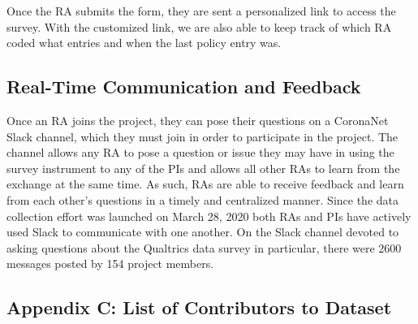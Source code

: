 \documentclass[]{article}
\begin{document}
Once the RA submits the form, they are sent a personalized link to access the survey. With the customized link, we are also able to keep track of which RA coded what entries and when the last policy entry was.

\hypertarget{real-time-communication-and-feedback}{%
\subsection{Real-Time Communication and Feedback}\label{real-time-communication-and-feedback}}

Once an RA joins the project, they can pose their questions on a CoronaNet Slack channel, which they must join in order to participate in the project. The channel allows any RA to pose a question or issue they may have in using the survey instrument to any of the PIs and allows all other RAs to learn from the exchange at the same time. As such, RAs are able to receive feedback and learn from each other's questions in a timely and centralized manner. Since the data collection effort was launched on March 28, 2020 both RAs and PIs have actively used Slack to communicate with one another. On the Slack channel devoted to asking questions about the Qualtrics data survey in particular, there were 2600 messages posted by 154 project members.

\hypertarget{appendix-c-list-of-contributors-to-dataset}{%
\subsection*{Appendix C: List of Contributors to Dataset}\label{appendix-c-list-of-contributors-to-dataset}}
\end{document}
